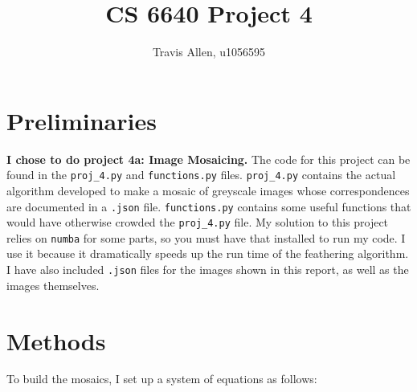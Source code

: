 \documentclass[]{article}
\title{CS 6640 Project 4}
\author{Travis Allen, u1056595}
\begin{document}
	\maketitle
	
	\newpage
	\tableofcontents
	\newpage
	\section{Preliminaries}

	\vskip 10pt

	\textbf{I chose to do project 4a: Image Mosaicing.} The code for this project can be found in the \texttt{proj\_4.py} and \texttt{functions.py} files. \texttt{proj\_4.py} contains the actual algorithm developed to make a mosaic of greyscale images whose correspondences are documented in a \texttt{.json} file. \texttt{functions.py} contains some useful functions that would have otherwise crowded the \texttt{proj\_4.py} file. My solution to this project relies on \texttt{numba} for some parts, so you must have that installed to run my code. I use it because it dramatically speeds up the run time of the feathering algorithm. I have also included \texttt{.json} files for the images shown in this report, as well as the images themselves. 

\section{Methods}
	To build the mosaics, I set up a system of equations as follows:
	
\end{document}
